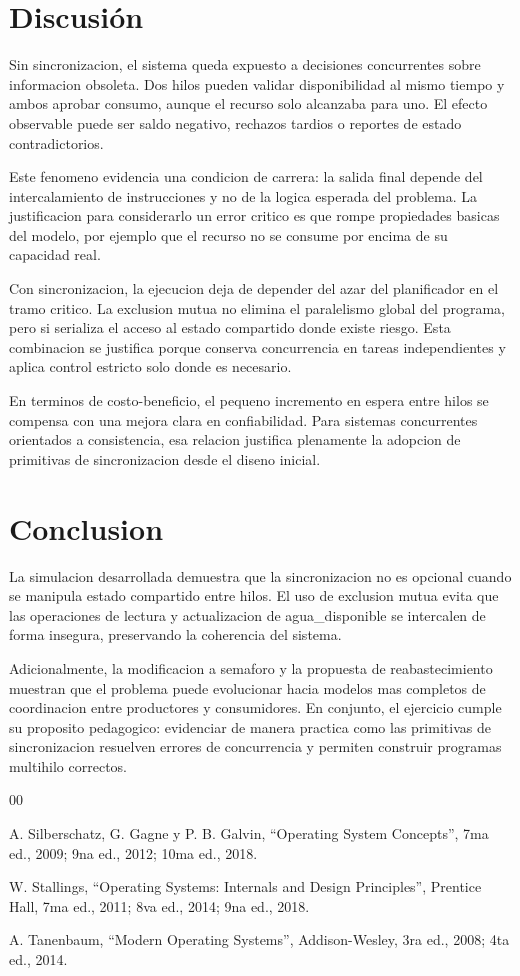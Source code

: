 ﻿\documentclass[conference]{IEEEtran}
\begin{document}
\section{Discusión}
Sin sincronizacion, el sistema queda expuesto a decisiones concurrentes sobre informacion obsoleta. Dos hilos pueden validar disponibilidad al mismo tiempo y ambos aprobar consumo, aunque el recurso solo alcanzaba para uno. El efecto observable puede ser saldo negativo, rechazos tardios o reportes de estado contradictorios.

Este fenomeno evidencia una condicion de carrera: la salida final depende del intercalamiento de instrucciones y no de la logica esperada del problema. La justificacion para considerarlo un error critico es que rompe propiedades basicas del modelo, por ejemplo que el recurso no se consume por encima de su capacidad real.

Con sincronizacion, la ejecucion deja de depender del azar del planificador en el tramo critico. La exclusion mutua no elimina el paralelismo global del programa, pero si serializa el acceso al estado compartido donde existe riesgo. Esta combinacion se justifica porque conserva concurrencia en tareas independientes y aplica control estricto solo donde es necesario.

En terminos de costo-beneficio, el pequeno incremento en espera entre hilos se compensa con una mejora clara en confiabilidad. Para sistemas concurrentes orientados a consistencia, esa relacion justifica plenamente la adopcion de primitivas de sincronizacion desde el diseno inicial.

\section{Conclusion}
La simulacion desarrollada demuestra que la sincronizacion no es opcional cuando se manipula estado compartido entre hilos. El uso de exclusion mutua evita que las operaciones de lectura y actualizacion de agua\_disponible se intercalen de forma insegura, preservando la coherencia del sistema.

Adicionalmente, la modificacion a semaforo y la propuesta de reabastecimiento muestran que el problema puede evolucionar hacia modelos mas completos de coordinacion entre productores y consumidores. En conjunto, el ejercicio cumple su proposito pedagogico: evidenciar de manera practica como las primitivas de sincronizacion resuelven errores de concurrencia y permiten construir programas multihilo correctos.

\begin{thebibliography}{00}

 A. Silberschatz, G. Gagne y P. B. Galvin, ``Operating System Concepts'', 7ma ed., 2009; 9na ed., 2012; 10ma ed., 2018.

 W. Stallings, ``Operating Systems: Internals and Design Principles'', Prentice Hall, 7ma ed., 2011; 8va ed., 2014; 9na ed., 2018.

 A. Tanenbaum, ``Modern Operating Systems'', Addison-Wesley, 3ra ed., 2008; 4ta ed., 2014.

\end{thebibliography}
\end{document}
